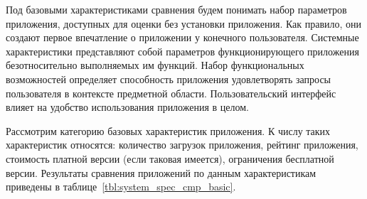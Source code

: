 Под базовыми характеристиками сравнения будем понимать
набор параметров приложения, доступных для оценки без установки приложения.
Как правило, они создают первое впечатление о приложении у конечного пользователя.
Системные характеристики представляют собой параметров функционирующего
приложения безотносительно выполняемых им функций.
Набор функциональных возможностей определяет способность приложения
удовлетворять запросы пользователя в контексте предметной области.
Пользовательский интерфейс влияет на удобство использования приложения в целом.

Рассмотрим категорию базовых характеристик приложения.
К числу таких характеристик относятся:
количество загрузок приложения, рейтинг приложения,
стоимость платной версии (если таковая имеется), ограничения бесплатной версии.
Результаты сравнения приложений по данным характеристикам приведены
в таблице~\ref{tbl:system_spec_cmp_basic}.

